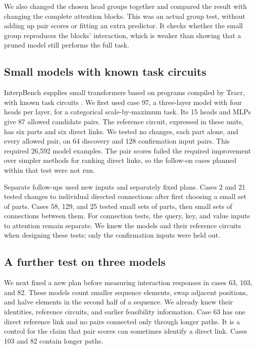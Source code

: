 \documentclass[11pt,letterpaper]{article}
\begin{document}
We also changed the chosen head groups together and compared the result with
changing the complete attention blocks. This was an actual group test, without
adding up pair scores or fitting an extra predictor. It checks whether the
small group reproduces the blocks' interaction, which is weaker than showing
that a pruned model still performs the full task.

\subsection*{Small models with known task circuits}
InterpBench supplies small transformers based on programs compiled by Tracr,
with known task circuits \cite{gupta2024interpbench,lindner2023tracr}. We first
used case 97, a three-layer model with four heads per layer, for a categorical
scale-by-maximum task. Its 15 heads and MLPs give 87 allowed candidate pairs.
The reference circuit, expressed in these units, has six parts and six direct
links. We tested no changes, each part alone, and every allowed pair, on 64
discovery and 128 confirmation input pairs. This required 26,592 model
examples. The pair scores failed the required improvement over simpler methods
for ranking direct links, so the follow-on cases planned within that test
were not run.

Separate follow-ups used new inputs and separately fixed plans. Cases 2 and 21
tested changes to individual directed connections after first choosing a small
set of parts. Cases 58, 129, and 25 tested small sets of parts, then small sets
of connections between them. For connection tests, the query, key, and value
inputs to attention remain separate. We knew the models and their reference
circuits when designing these tests; only the confirmation inputs were held out.

\subsection*{A further test on three models}
We next fixed a new plan before measuring interaction responses in cases 63,
103, and 82. These models count smaller sequence elements, swap adjacent
positions, and halve elements in the second half of a sequence. We already
knew their identities, reference circuits, and earlier feasibility information.
Case 63 has one direct reference link and no pairs connected only through
longer paths. It is a control for the claim that pair scores can sometimes
identify a direct link. Cases 103 and 82 contain longer paths.
\end{document}
